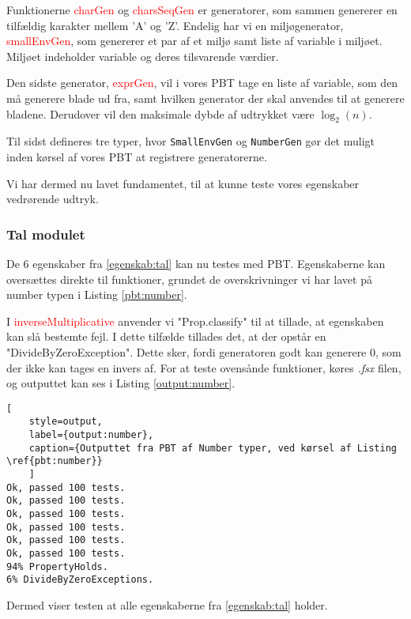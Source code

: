 Funktionerne \textcolor{red}{charGen} og \textcolor{red}{charsSeqGen} er generatorer, som sammen genererer en tilfældig karakter mellem 'A' og 'Z'. Endelig har vi en miljøgenerator, \textcolor{red}{smallEnvGen}, som genererer et par af et miljø samt liste af variable i miljøet. Miljøet indeholder variable og deres tilsvarende værdier.

Den sidste generator, \textcolor{red}{exprGen}, vil i vores PBT tage en liste af variable, som den må generere blade ud fra, samt hvilken generator der skal anvendes til at generere bladene. Derudover vil den maksimale dybde af udtrykket være \(\log_2(n)\).

Til sidst defineres tre typer, hvor \texttt{SmallEnvGen} og \texttt{NumberGen} gør det muligt inden kørsel af vores PBT at registrere generatorerne.

Vi har dermed nu lavet fundamentet, til at kunne teste vores egenskaber vedrørende udtryk.

\subsubsection{Tal modulet}\label{sec:PBT_number}
De 6 egenskaber fra \ref{egenskab:tal} kan nu testes med PBT. Egenskaberne kan oversættes direkte til funktioner, grundet de overskrivninger vi har lavet på number typen i Listing \ref{pbt:number}. 


I \textcolor{red}{inverseMultiplicative} anvender vi "Prop.classify" til at tillade, at egenskaben kan slå bestemte fejl. I dette tilfælde tillades det, at der opstår en "DivideByZeroException". Dette sker, fordi generatoren godt kan generere 0, som der ikke kan tages en invers af. For at teste ovensånde funktioner, køres \textit{.fsx} filen, og outputtet kan ses i Listing \ref{output:number}.
\begin{lstlisting}[
    style=output, 
    label={output:number}, 
    caption={Outputtet fra PBT af Number typer, ved kørsel af Listing \ref{pbt:number}}
    ]        
Ok, passed 100 tests.
Ok, passed 100 tests.
Ok, passed 100 tests.
Ok, passed 100 tests.
Ok, passed 100 tests.
Ok, passed 100 tests.
94% PropertyHolds.
6% DivideByZeroExceptions.
\end{lstlisting}

Dermed viser testen at alle egenskaberne fra \ref{egenskab:tal} holder. 


